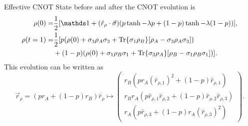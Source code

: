 \begin{frame}{Effective CNOT}
    State before and after the CNOT evolution is
    \begin{align*}
        \rho(0)=&\frac{1}{2}[\Id+(\hat{r}_{\rho}\cdot\vec{\sigma})(p\tanh{-\lambda p}+(1-p)\tanh{-\lambda (1-p)})],\\
        \rho(t=1)=&\frac{1}{2}[p(\rho(0)+\sigma_{3}\rho_{A}\sigma_{3}+\Tr{\sigma_{1}\rho_{B}}[\rho_{A}-\sigma_{3}\rho_{A}\sigma_{3}])\\
    &+(1-p)(\rho(0)+\sigma_{1}\rho_{B}\sigma_{1}+\Tr{\sigma_{3}\rho_{A}}[\rho_{B}-\sigma_{1}\rho_{B}\sigma_{1}])].
        \end{align*}
      This evolution can be written as
      \begin{equation*}
        \vec{r}_{\rho}=(pr_{A}+(1-p)r_{B})\hat{r}_{\rho}\mapsto\begin{pmatrix}
            r_{B}(pr_{A}(\hat{r}_{\rho,1})^2+(1-p)\hat{r}_{\rho,1})\\
            r_{B}r_{A}(p\hat{r}_{\rho,1}\hat{r}_{\rho,2}+(1-p)\hat{r}_{\rho,2}\hat{r}_{\rho,3})\\
            r_{A}(p\hat{r}_{\rho,3}+(1-p)r_{A}(\hat{r}_{\rho,3})^{2})
        \end{pmatrix}.
      \end{equation*}
\end{frame}

